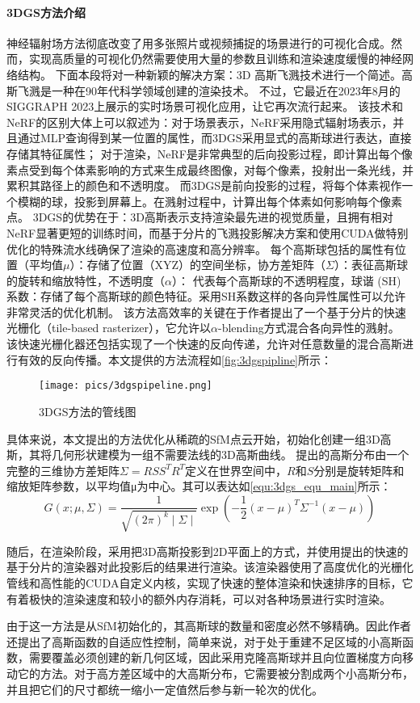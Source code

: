 \paragraph{3DGS方法介绍}
神经辐射场方法彻底改变了用多张照片或视频捕捉的场景进行的可视化合成。然而，实现高质量的可视化仍然需要使用大量的参数且训练和渲染速度缓慢的神经网络结构。
下面本段将对一种新颖的解决方案：3D 高斯飞溅技术进行一个简述。高斯飞溅是一种在90年代科学领域创建的渲染技术。
不过，它最近在2023年8月的 SIGGRAPH 2023上展示的实时场景可视化应用，让它再次流行起来。
该技术和NeRF的区别大体上可以叙述为：对于场景表示，NeRF采用隐式辐射场表示，并且通过MLP查询得到某一位置的属性，而3DGS采用显式的高斯球进行表达，直接存储其特征属性；
对于渲染，NeRF是非常典型的后向投影过程，即计算出每个像素点受到每个体素影响的方式来生成最终图像，对每个像素，投射出一条光线，并累积其路径上的颜色和不透明度。
而3DGS是前向投影的过程，将每个体素视作一个模糊的球，投影到屏幕上。在溅射过程中，计算出每个体素如何影响每个像素点。
3DGS的优势在于：3D高斯表示支持渲染最先进的视觉质量，且拥有相对NeRF显著更短的训练时间，而基于分片的飞溅投影解决方案和使用CUDA做特别优化的特殊流水线确保了渲染的高速度和高分辨率。
每个高斯球包括的属性有位置（平均值$\mu$）：存储了位置（XYZ）的空间坐标，协方差矩阵（$\Sigma$）：表征高斯球的旋转和缩放特性，不透明度（$\alpha$）：
代表每个高斯球的不透明程度，球谐 (SH) 系数：存储了每个高斯球的颜色特征。采用SH系数这样的各向异性属性可以允许非常灵活的优化机制。
该方法高效率的关键在于作者提出了一个基于分片的快速光栅化（tile-based rasterizer），它允许以$\alpha$-blending方式混合各向异性的溅射。
该快速光栅化器还包括实现了一个快速的反向传递，允许对任意数量的混合高斯进行有效的反向传播。本文提供的方法流程如\autoref{fig:3dgspipline}所示：

\begin{figure}[htbp]
    \centering
    \texttt{[image: pics/3dgspipeline.png]}
    \caption{\label{fig:3dgspipline}3DGS方法的管线图~\cite{kerbl20233d}}
\end{figure}

具体来说，本文提出的方法优化从稀疏的SfM点云开始，初始化创建一组3D高斯，其将几何形状建模为一组不需要法线的3D高斯曲线。
提出的高斯分布由一个完整的三维协方差矩阵\(\Sigma=RSS^TR^T\)定义在世界空间中，$R$和$S$分别是旋转矩阵和缩放矩阵参数，以平均值μ为中心。其可以表达如\autoref{equ:3dgs_equ_main}所示：
\begin{equation}
    \label{equ:3dgs_equ_main}
    G\left(x;\mu,\Sigma\right)=\frac1{\sqrt{(2\pi)^k\mid\Sigma\mid}}\exp\left(-\frac12(x-\mu)^T\Sigma^{-1}(x-\mu)\right)
\end{equation}
\par 随后，在渲染阶段，采用把3D高斯投影到2D平面上的方式，并使用提出的快速的基于分片的渲染器对此投影后的结果进行渲染。该渲染器使用了高度优化的光栅化管线和高性能的CUDA自定义内核，实现了快速的整体渲染和快速排序的目标，它有着极快的渲染速度和较小的额外内存消耗，可以对各种场景进行实时渲染。
\par 由于这一方法是从SfM初始化的，其高斯球的数量和密度必然不够精确。因此作者还提出了高斯函数的自适应性控制，简单来说，对于处于重建不足区域的小高斯函数，需要覆盖必须创建的新几何区域，因此采用克隆高斯球并且向位置梯度方向移动它的方法。对于高方差区域中的大高斯分布，它需要被分割成两个小高斯分布，并且把它们的尺寸都统一缩小一定值然后参与新一轮次的优化。
